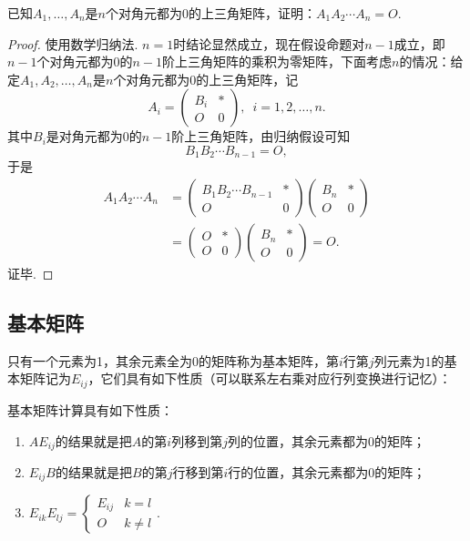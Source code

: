 \begin{example}{}{}
    已知$A_1,\ldots,A_n$是$n$个对角元都为0的上三角矩阵，证明：$A_1A_2\cdots A_n=O$.
\end{example}

\begin{proof}
    使用数学归纳法. $n=1$时结论显然成立，现在假设命题对$n-1$成立，即$n-1$个对角元都为0的$n-1$阶上三角矩阵的乘积为零矩阵，下面考虑$n$的情况：给定$A_1,A_2,\ldots,A_n$是$n$个对角元都为0的上三角矩阵，记
    \[A_i=\begin{pmatrix}
            B_i & * \\ O & 0
        \end{pmatrix},\enspace i=1,2,\ldots,n.\]
    其中$B_i$是对角元都为0的$n-1$阶上三角矩阵，由归纳假设可知
    \[B_1B_2\cdots B_{n-1}=O,\]
    于是
    \begin{align*}
        A_1A_2\cdots A_n
         & =\begin{pmatrix}
                B_1B_2\cdots B_{n-1} & * \\ O & 0
            \end{pmatrix}
        \begin{pmatrix}
            B_n & * \\ O & 0
        \end{pmatrix}                      \\
         & =\begin{pmatrix}
                O & * \\ O & 0
            \end{pmatrix}
        \begin{pmatrix}
            B_n & * \\ O & 0
        \end{pmatrix}=  O.
    \end{align*}
    证毕.
\end{proof}

\subsection{基本矩阵}

只有一个元素为1，其余元素全为0的矩阵称为基本矩阵，第$i$行第$j$列元素为1的基本矩阵记为$E_{ij}$，它们具有如下性质（可以联系左右乘对应行列变换进行记忆）：
\begin{theorem}{}{}
    基本矩阵计算具有如下性质：
    \begin{enumerate}
        \item $AE_{ij}$的结果就是把$A$的第$i$列移到第$j$列的位置，其余元素都为0的矩阵；

        \item $E_{ij}B$的结果就是把$B$的第$j$行移到第$i$行的位置，其余元素都为0的矩阵；

        \item $E_{ik}E_{lj} = \begin{cases}
                      E_{ij} & k = l    \\
                      O      & k \neq l
                  \end{cases}$.
    \end{enumerate}
\end{theorem}

